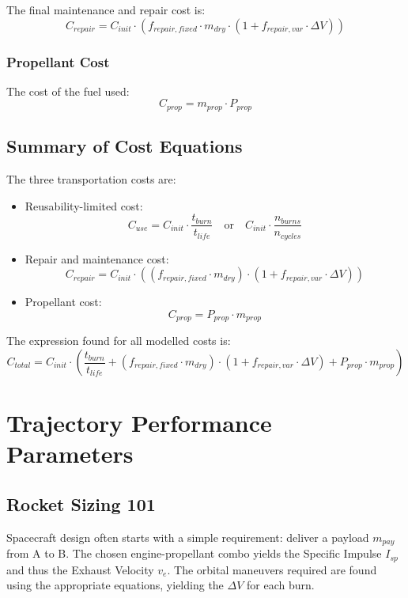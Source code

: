 \documentclass{article}
\begin{document}
The final maintenance and repair cost is:
\begin{equation}
C_{repair} = C_{init} \cdot (f_{repair,fixed} \cdot m_{dry} \cdot (1 + f_{repair,var} \cdot \Delta V))
\end{equation}

\subsubsection{Propellant Cost}
The cost of the fuel used:
\begin{equation}
C_{prop} = m_{prop} \cdot P_{prop}
\end{equation}

\subsection{Summary of Cost Equations}
The three transportation costs are:
\begin{itemize}
    \item Reusability-limited cost:
    \begin{equation}
    C_{use} = C_{init} \cdot \frac{t_{burn}}{t_{life}}  \quad  \text{or} \quad C_{init} \cdot \frac{n_{burns}}{n_{cycles}}
    \end{equation}
    \item Repair and maintenance cost:
    \begin{equation}
    C_{repair} = C_{init} \cdot ((f_{repair, fixed} \cdot m_{dry} ) \cdot (1 + f_{repair, var} \cdot \Delta V ) )
    \end{equation}
    \item Propellant cost:
    \begin{equation}
    C_{prop} =P_{prop} \cdot m_{prop}
    \end{equation}
\end{itemize}

The expression found for all modelled costs is:
\begin{equation}
C_{total} = C_{init} \cdot \left( \frac{t_{burn}}{t_{life}} + (f_{repair, fixed} \cdot m_{dry} ) \cdot (1 + f_{repair, var} \cdot \Delta V ) + P_{prop} \cdot m_{prop} \right)
\end{equation}

\section{Trajectory Performance Parameters}
\subsection{Rocket Sizing 101}
Spacecraft design often starts with a simple requirement: deliver a payload $m_{pay}$ from A to B. The chosen engine-propellant combo yields the Specific Impulse $I_{sp}$ and thus the Exhaust Velocity $v_e$. The orbital maneuvers required are found using the appropriate equations, yielding the $\Delta V$ for each burn.
\end{document}
